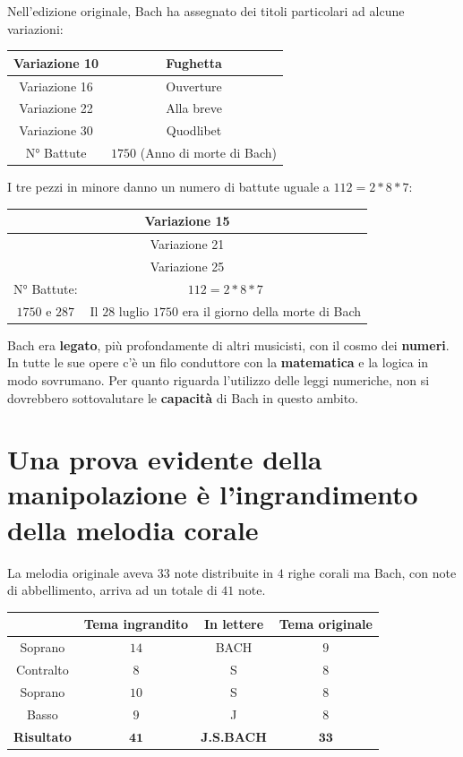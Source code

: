 \documentclass[12pt]{article}
\begin{document}
Nell’edizione originale, Bach ha assegnato dei titoli particolari ad alcune variazioni:

\begin{center}
\begin{tabular}{|c|c|}
  \hline
  Variazione 10 &  Fughetta\\
  \hline
  Variazione 16 & Ouverture\\ 
  \hline
  Variazione 22 & Alla breve\\
  \hline
  Variazione 30 & Quodlibet\\ 
  \hline
  N° Battute & $1750$ (Anno di morte di Bach)\\
  \hline
\end{tabular}
\end{center}

I tre pezzi in minore danno un numero di battute uguale a $112=2*8*7$:

\begin{center}
\begin{tabular}{|c|c|}
  \hline
  \multicolumn{2}{|c|}{Variazione 15}\\
  \hline
  \multicolumn{2}{|c|}{Variazione 21}\\ 
  \hline
  \multicolumn{2}{|c|}{Variazione 25}\\ 
  \hline
  N° Battute: & $112 = 2*8*7$ \\
  \hline
  $1750$ e $287$ & Il $28$ luglio $1750$ era il giorno della morte di Bach\\
  \hline
\end{tabular}
\end{center}

Bach era \textbf{legato}, più profondamente di altri musicisti, con il cosmo dei \textbf{numeri}.
In tutte le sue opere c’è un filo conduttore con la \textbf{matematica} e la logica in modo sovrumano.
Per quanto riguarda l’utilizzo delle leggi numeriche, non si dovrebbero sottovalutare le \textbf{capacità} di
Bach in questo ambito.

\section{Una prova evidente della manipolazione è l’ingrandimento della melodia corale}
La melodia originale aveva $33$ note distribuite in $4$ righe corali ma Bach, con note di abbellimento,
arriva ad un totale di $41$ note.

\begin{center}
\begin{tabular}{|c|c|c|c|}
  \hline
  & Tema ingrandito & In lettere & Tema originale\\
  \hline
  Soprano & $14$ & BACH & $9$\\ 
  \hline
  Contralto & $8$ & S & $8$\\ 
  \hline
  Soprano & $10$ & S & $8$\\ 
  \hline
  Basso & $9$ & J & $8$\\ 
  \hline
  \textbf{Risultato} & $\textbf{41}$ & \textbf{J.S.BACH} & $\textbf{33}$\\ 
  \hline

\end{tabular}
\end{center}
\end{document}
